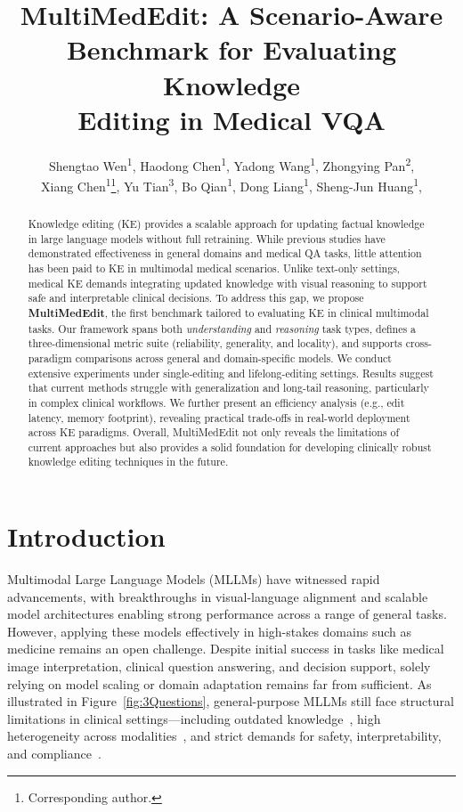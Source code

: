 \documentclass[letterpaper]{article} %
\title{MultiMedEdit: A Scenario-Aware Benchmark for Evaluating Knowledge \\ Editing in Medical VQA}
\author{
    Shengtao Wen\textsuperscript{\rm 1}\equalcontrib,
    Haodong Chen\textsuperscript{\rm 1}\equalcontrib, 
     Yadong Wang\textsuperscript{\rm 1}, 
    Zhongying Pan\textsuperscript{\rm 2},\\ 
    Xiang Chen\textsuperscript{\rm 1}\thanks{Corresponding author.}, 
    Yu Tian\textsuperscript{\rm 3}, 
    Bo Qian\textsuperscript{\rm 1},
    Dong Liang\textsuperscript{\rm 1}, 
    Sheng-Jun Huang\textsuperscript{\rm 1},  
}
\begin{document}
\maketitle


\begin{abstract}
Knowledge editing (KE) provides a scalable approach for updating factual knowledge in large language models without full retraining. While previous studies have demonstrated effectiveness in general domains and medical QA tasks, little attention has been paid to KE in multimodal medical scenarios. Unlike text-only settings, medical KE demands integrating updated knowledge with visual reasoning to support safe and interpretable clinical decisions. To address this gap, we propose \textbf{MultiMedEdit}, the first benchmark tailored to evaluating KE in clinical multimodal tasks. Our framework spans both \textit{understanding} and \textit{reasoning} task types, defines a three-dimensional metric suite (reliability, generality, and locality), and supports cross-paradigm comparisons across general and domain-specific models. We conduct extensive experiments under single-editing and lifelong-editing settings. Results suggest that current methods struggle with generalization and long-tail reasoning, particularly in complex clinical workflows. We further present an efficiency analysis (e.g., edit latency, memory footprint), revealing practical trade-offs in real-world deployment across KE paradigms. Overall, MultiMedEdit not only reveals the limitations of current approaches but also provides a solid foundation for developing clinically robust knowledge editing techniques in the future.
\end{abstract}

\section{Introduction}



Multimodal Large Language Models (MLLMs) have witnessed rapid advancements, with breakthroughs in visual-language alignment and scalable model architectures enabling strong performance across a range of general tasks. However, applying these models effectively in high-stakes domains such as medicine remains an open challenge. Despite initial success in tasks like medical image interpretation, clinical question answering, and decision support, solely relying on model scaling or domain adaptation remains far from sufficient. As illustrated in Figure~\ref{fig:3Questions}, general-purpose MLLMs still face structural limitations in clinical settings—including outdated knowledge~\citep{wu2025driftmedqa,kim2025medicalhallucination}, high heterogeneity across modalities~\citep{unihd,dai2025climb}, and strict demands for safety, interpretability, and  compliance~\citep{wang2024safetyChallenges,han2024medSafetyBench,workum2025safeLLM}.
\end{document}
